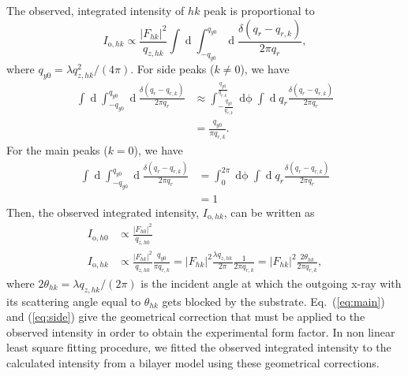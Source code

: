 \documentclass[12pt,letterpaper]{article}
\begin{document}
The observed, integrated intensity of $hk$ peak is proportional to
\begin{equation}
  I_{\mathrm{o},hk} 
    \propto \frac{\lvert F_{hk} \rvert^2}{q_{z,hk}} \int\mathop{dq_x} 
            \int_{-q_{y0}}^{q_{y0}}
            \mathop{dq_y} \frac{\delta(q_r-q_{r,k})}{2\pi q_r},
\end{equation}
where $q_{y0} = \lambda q_{z,hk}^2/(4\pi)$.
For side peaks ($k \neq 0$), we have 
\begin{align}
  \int\mathop{dq_x} \int_{-q_{y0}}^{q_{y0}}\mathop{dq_y} \frac{\delta(q_r-q_{r,k})}{2\pi q_r}
  &\approx \int_{-\frac{q_{y0}}{q_{r,k}}}^{\frac{q_{y0}}{q_{r,k}}} \mathop{d\phi} 
          \int \mathop{dq_r} q_r\frac{\delta(q_r-q_{r,k})}{2\pi q_r} \\
 &= \frac{q_{y0}}{\pi q_{r,k}}.
\end{align}
For the main peaks ($k=0$), we have 
\begin{align}
  \int\mathop{dq_x} \int_{-q_{y0}}^{q_{y0}}\mathop{dq_y} \frac{\delta(q_r-q_{r,k})}{2\pi q_r}
  &= \int_0^{2\pi}\mathop{d\phi} \int\mathop{dq_r} q_r\frac{\delta(q_r-q_{r,k})}{2\pi q_r} \\
  &= 1
\end{align}
Then, the observed integrated intensity, $I_{\mathrm{o},hk}$, can be written as
\begin{align}
  I_{\mathrm{o},h0} &\propto \frac{|F_{h0}|^2}{q_{z,h0}} \label{eq:main}\\
  I_{\mathrm{o},hk} &\propto \frac{|F_{hk}|^2}{q_{z,hk}} \frac{q_{y0}}{\pi q_{r,k}}
    = |F_{hk}|^2 \frac{\lambda q_{z,hk}}{2\pi}\frac{1}{2\pi q_{r,k}}
    = |F_{hk}|^2 \frac{2\theta_{hk}}{2\pi q_{r,k}}, \label{eq:side}
\end{align}
where $2\theta_{hk} = \lambda q_{z,hk}/(2\pi)$ is the incident angle at which 
the outgoing x-ray with its scattering angle equal to $\theta_{hk}$ gets 
blocked by the substrate.
Eq.~(\ref{eq:main}) and (\ref{eq:side}) give the 
geometrical correction that must be applied to the observed intensity
in order to obtain the experimental form factor. In non linear least
square fitting procedure, we fitted the observed integrated intensity to
the calculated intensity from a bilayer model using these geometrical corrections. 


\end{document}
